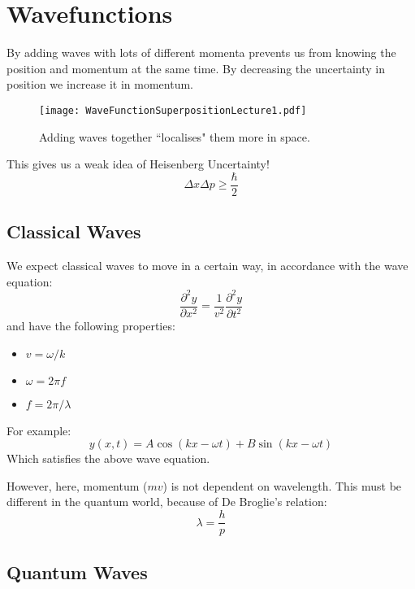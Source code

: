 \section{Wavefunctions}

By adding waves with lots of different momenta prevents us from knowing the
position and momentum at the same time. By decreasing the uncertainty in
position we increase it in momentum.
\begin{figure}[h!]
	\centering
	\texttt{[image: WaveFunctionSuperpositionLecture1.pdf]}
	\caption{Adding waves together ``localises" them more in space.}
\end{figure}
This gives us a weak idea of Heisenberg Uncertainty!
$$
	\Delta x \Delta p \geq \frac{\hbar}{2}
$$

\subsection{Classical Waves}

We expect classical waves to move in a certain way, in accordance with the wave
equation:
$$
	\frac{\partial^2y}{\partial x^2} =
	\frac{1}{v^2}\frac{\partial^2y}{\partial t^2}
$$
and have the following properties:
\begin{itemize}
	\item $v = \omega/k$
	\item $\omega = 2\pi f$
	\item $f = 2\pi/\lambda$
\end{itemize}
For example:
$$
	y(x,t) = A\cos(kx - \omega t) + B\sin(kx - \omega t)
$$
Which satisfies the above wave equation.

However, here, momentum ($mv$) is not dependent on wavelength. This must be
different in the quantum world, because of De Broglie's relation:
$$
	\lambda = \frac{h}{p}
$$

\subsection{Quantum Waves}


